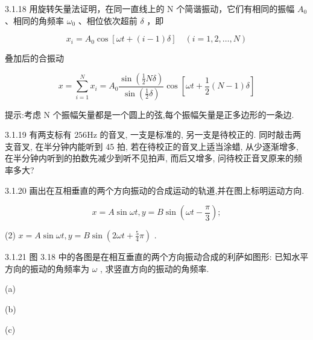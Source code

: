 \begin{problem}{3.1.18}
用旋转矢量法证明，在同一直线上的 N 个简谐振动，它们有相同的振幅 $A_{0}$ 、相同的角频率 $\omega_{0}$ 、相位依次超前 $\delta$ ，即

\[
x _ {i} = A _ {0} \cos [ \omega t + (i - 1) \delta ] \quad (i = 1, 2, \dots , N)
\]

叠加后的合振动

\[
x = \sum_ {i = 1} ^ {N} x _ {i} = A _ {0} \frac {\sin \left(\frac {1}{2} N \delta\right)}{\sin \left(\frac {1}{2} \delta\right)} \cos \left[ \omega t + \frac {1}{2} (N - 1) \delta \right]
\]

提示:考虑 N 个振幅矢量都是一个圆上的弦,每个振幅矢量是正多边形的一条边.
\end{problem}
\clearpage


\begin{problem}{3.1.19}
有两支标有 $256\mathrm{Hz}$ 的音叉, 一支是标准的, 另一支是待校正的. 同时敲击两支音叉, 在半分钟内能听到 45 拍, 若在待校正的音叉上适当涂蜡, 从少逐渐增多, 在半分钟内听到的拍数先减少到听不见拍声, 而后又增多, 问待校正音叉原来的频率多大?
\end{problem}
\clearpage


\begin{problem}{3.1.20}
画出在互相垂直的两个方向振动的合成运动的轨道,并在图上标明运动方向.

\[
x = A \sin \omega t, y = B \sin \left(\omega t - \frac {\pi}{3}\right); \tag {1}
\]

(2) $x = A\sin \omega t, y = B\sin \left(2\omega t + \frac{5}{4}\pi\right)$ .
\end{problem}
\clearpage


\begin{problem}{3.1.21}
图 3.18 中的各图是在相互垂直的两个方向振动合成的利萨如图形: 已知水平方向的振动的角频率为 $\omega$ , 求竖直方向的振动的角频率.

(a)

(b)

(c)
\begin{center}

\end{center}
\begin{center}

\end{center}
\begin{center}

\end{center}
\end{problem}
\clearpage


